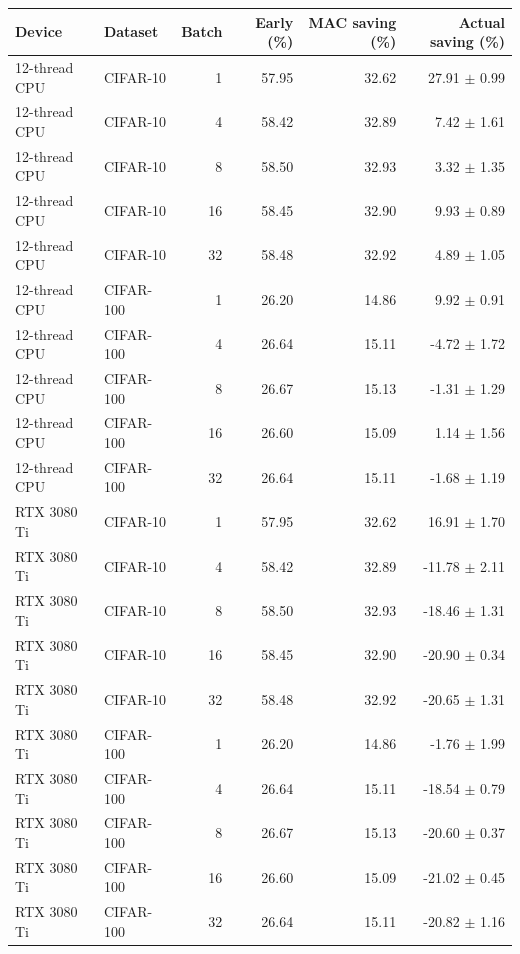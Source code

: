 \begin{tabular}{llrrrr}
\toprule
Device & Dataset & Batch & Early (\%) & MAC saving (\%) & Actual saving (\%) \\
\midrule
12-thread CPU & CIFAR-10 & 1 & 57.95 & 32.62 & 27.91 $\pm$ 0.99 \\
12-thread CPU & CIFAR-10 & 4 & 58.42 & 32.89 & 7.42 $\pm$ 1.61 \\
12-thread CPU & CIFAR-10 & 8 & 58.50 & 32.93 & 3.32 $\pm$ 1.35 \\
12-thread CPU & CIFAR-10 & 16 & 58.45 & 32.90 & 9.93 $\pm$ 0.89 \\
12-thread CPU & CIFAR-10 & 32 & 58.48 & 32.92 & 4.89 $\pm$ 1.05 \\
12-thread CPU & CIFAR-100 & 1 & 26.20 & 14.86 & 9.92 $\pm$ 0.91 \\
12-thread CPU & CIFAR-100 & 4 & 26.64 & 15.11 & -4.72 $\pm$ 1.72 \\
12-thread CPU & CIFAR-100 & 8 & 26.67 & 15.13 & -1.31 $\pm$ 1.29 \\
12-thread CPU & CIFAR-100 & 16 & 26.60 & 15.09 & 1.14 $\pm$ 1.56 \\
12-thread CPU & CIFAR-100 & 32 & 26.64 & 15.11 & -1.68 $\pm$ 1.19 \\
RTX 3080 Ti & CIFAR-10 & 1 & 57.95 & 32.62 & 16.91 $\pm$ 1.70 \\
RTX 3080 Ti & CIFAR-10 & 4 & 58.42 & 32.89 & -11.78 $\pm$ 2.11 \\
RTX 3080 Ti & CIFAR-10 & 8 & 58.50 & 32.93 & -18.46 $\pm$ 1.31 \\
RTX 3080 Ti & CIFAR-10 & 16 & 58.45 & 32.90 & -20.90 $\pm$ 0.34 \\
RTX 3080 Ti & CIFAR-10 & 32 & 58.48 & 32.92 & -20.65 $\pm$ 1.31 \\
RTX 3080 Ti & CIFAR-100 & 1 & 26.20 & 14.86 & -1.76 $\pm$ 1.99 \\
RTX 3080 Ti & CIFAR-100 & 4 & 26.64 & 15.11 & -18.54 $\pm$ 0.79 \\
RTX 3080 Ti & CIFAR-100 & 8 & 26.67 & 15.13 & -20.60 $\pm$ 0.37 \\
RTX 3080 Ti & CIFAR-100 & 16 & 26.60 & 15.09 & -21.02 $\pm$ 0.45 \\
RTX 3080 Ti & CIFAR-100 & 32 & 26.64 & 15.11 & -20.82 $\pm$ 1.16 \\
\bottomrule
\end{tabular}
